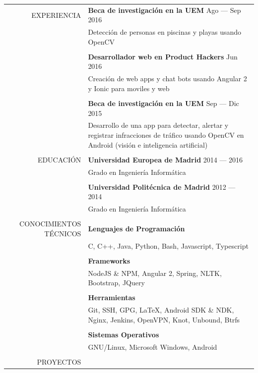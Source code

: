 \documentclass[a4paper, 11pt]{article}
\begin{document}
    \begin{longtable}{rp{11cm}}
        EXPERIENCIA
        & {\bf Beca de investigación en la UEM} \hfill Ago --- Sep 2016\\
        & Detección de personas en piscinas y playas usando OpenCV\\\\
        & {\bf Desarrollador web en Product Hackers} \hfill Jun 2016\\
        & Creación de web apps y chat bots usando Angular 2 y Ionic para moviles y web\\\\
        & {\bf Beca de investigación en la UEM} \hfill Sep --- Dic 2015\\
        & Desarrollo de una app para detectar, alertar y registrar infracciones de tráfico usando OpenCV en Android (visión e inteligencia artificial)\\
        \\
        EDUCACIÓN
        & {\bf Universidad Europea de Madrid} \hfill 2014 --- 2016\\
        & Grado en Ingeniería Informática\\\\
        & {\bf Universidad Politécnica de Madrid} \hfill 2012 --- 2014\\
        & Grado en Ingeniería Informática\\\\
        CONOCIMIENTOS TÉCNICOS
        & {\bf Lenguajes de Programación}\\
        & C, C++, Java, Python, Bash, Javascript, Typescript\\\\
        & {\bf Frameworks}\\
        & NodeJS \& NPM, Angular 2, Spring, NLTK, Bootstrap, JQuery\\\\
        & {\bf Herramientas}\\
        & Git, SSH, GPG, \LaTeX, Android SDK \& NDK, Nginx, Jenkins, OpenVPN, Knot, Unbound, Btrfs\\\\
        & {\bf Sistemas Operativos}\\
        & GNU/Linux, Microsoft Windows, Android\\
        \\
        PROYECTOS
        & \vspace{-8mm}
        \begin{itemize}[leftmargin=0cm,label={}]

\end{itemize}
\end{longtable}
\end{document}
